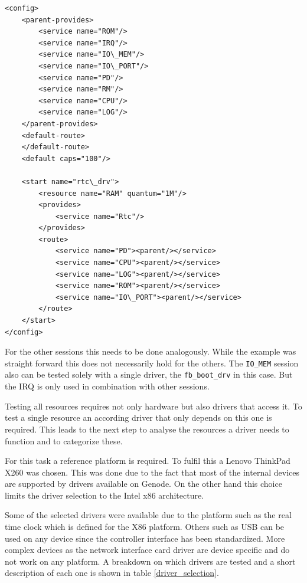 \documentclass[
a4paper,
11pt,
twoside
]{report}
\begin{document}
		
		
		\begin{lstlisting}[basicstyle=\ttfamily\footnotesize]
<config>
	<parent-provides>
		<service name="ROM"/>
		<service name="IRQ"/>
		<service name="IO\_MEM"/>
		<service name="IO\_PORT"/>
		<service name="PD"/>
		<service name="RM"/>
		<service name="CPU"/>
		<service name="LOG"/>
	</parent-provides>
	<default-route>
	</default-route>
	<default caps="100"/>
		
	<start name="rtc\_drv">
		<resource name="RAM" quantum="1M"/>
		<provides>
			<service name="Rtc"/>
		</provides>
		<route>
			<service name="PD"><parent/></service>
			<service name="CPU"><parent/></service>
			<service name="LOG"><parent/></service>
			<service name="ROM"><parent/></service>
			<service name="IO\_PORT"><parent/></service>
		</route>
	</start>
</config>
		\end{lstlisting}
		
		For the other sessions this needs to be done analogously.
		While the example was straight forward this does not necessarily hold for the others.
		The \texttt{IO\_MEM} session also can be tested solely with a single driver, the \texttt{fb\_boot\_drv} in this case. But the IRQ is only used in combination with other sessions.
		
		Testing all resources requires not only hardware but also drivers that access it.
		To test a single resource an according driver that only depends on this one is required.
		This leads to the next step to analyse the resources a driver needs to function and to categorize these.
		
		For this task a reference platform is required.
		To fulfil this a Lenovo ThinkPad X260 was chosen.
		This was done due to the fact that most of the internal devices are supported by drivers available on Genode.
		On the other hand this choice limits the driver selection to the Intel x86 architecture.
		
		Some of the selected drivers were available due to the platform such as the real time clock which is defined for the X86 platform.
		Others such as USB can be used on any device since the controller interface has been standardized.
		More complex devices as the network interface card driver are device specific and do not work on any platform.
		A breakdown on which drivers are tested and a short description of each one is shown in table \ref{driver_selection}.
		
\end{document}

